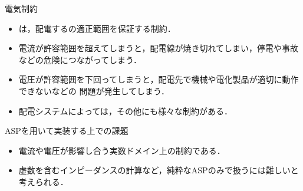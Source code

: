 \documentclass[dvipdfmx,11pt]{beamer}
\begin{document}
\begin{frame}{電気制約}
 \begin{itemize}
  \item {}は，配電するの適正範囲を保証する制約．
  \item 電流が許容範囲を超えてしまうと，配電線が焼き切れてしまい，停電や事故などの危険につながってしまう．
  \item 電圧が許容範囲を下回ってしまうと，配電先で機械や電化製品が適切に動作できないなどの
		問題が発生してしまう．
  \item 配電システムによっては，その他にも様々な制約がある．
 \end{itemize}
 \vfill
 \begin{alertblock}{ASPを用いて実装する上での課題}
  \begin{itemize}
   \item 電流や電圧が影響し合う実数ドメイン上の制約である．
   \item 虚数を含むインピーダンスの計算など，純粋なASPのみで扱うには難しいと考えられる．
  \end{itemize}
 \end{alertblock}\vfill
\end{frame}
\end{document}
